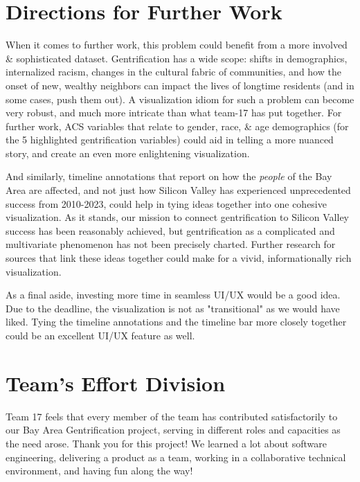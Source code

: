 \documentclass{article}
\begin{document}
\section{Directions for Further Work}

    When it comes to further work, this problem could benefit from a more involved \& sophisticated dataset. Gentrification has a wide scope: shifts in demographics, internalized racism, changes in the cultural fabric of communities, and how the onset of new, wealthy neighbors can impact the lives of longtime residents (and in some cases, push them out). A visualization idiom for such a problem can become very robust, and much more intricate than what team-17 has put together. For further work, ACS variables that relate to gender, race, \& age demographics (for the 5 highlighted gentrification variables) could aid in telling a more nuanced story, and create an even more enlightening visualization. 

    And similarly, timeline annotations that report on how the \textit{people} of the Bay Area are affected, and not just how Silicon Valley has experienced unprecedented success from 2010-2023, could help in tying ideas together into one cohesive visualization. As it stands, our mission to connect gentrification to Silicon Valley success has been reasonably achieved, but gentrification as a complicated and multivariate phenomenon has not been precisely charted. Further research for sources that link these ideas together could make for a vivid, informationally rich visualization.

    As a final aside, investing more time in seamless UI/UX would be a good idea. Due to the deadline, the visualization is not as "transitional" as we would have liked. Tying the timeline annotations and the timeline bar more closely together could be an excellent UI/UX feature as well. 
    
\section{Team's Effort Division}

Team 17 feels that every member of the team has contributed satisfactorily to our Bay Area Gentrification project, serving in different roles and capacities as the need arose. Thank you for this project! We learned a lot about software engineering, delivering a product as a team, working in a collaborative technical environment, and having fun along the way!

\nocite{*}


\end{document}
